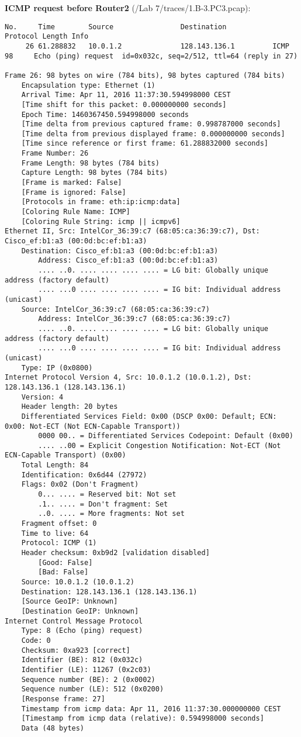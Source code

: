 \textbf{ICMP request before Router2} (/Lab 7/traces/1.B-3.PC3.pcap):
\begin{lstlisting}
No.     Time        Source                Destination           Protocol Length Info
     26 61.288832   10.0.1.2              128.143.136.1         ICMP     98     Echo (ping) request  id=0x032c, seq=2/512, ttl=64 (reply in 27)

Frame 26: 98 bytes on wire (784 bits), 98 bytes captured (784 bits)
    Encapsulation type: Ethernet (1)
    Arrival Time: Apr 11, 2016 11:37:30.594998000 CEST
    [Time shift for this packet: 0.000000000 seconds]
    Epoch Time: 1460367450.594998000 seconds
    [Time delta from previous captured frame: 0.998787000 seconds]
    [Time delta from previous displayed frame: 0.000000000 seconds]
    [Time since reference or first frame: 61.288832000 seconds]
    Frame Number: 26
    Frame Length: 98 bytes (784 bits)
    Capture Length: 98 bytes (784 bits)
    [Frame is marked: False]
    [Frame is ignored: False]
    [Protocols in frame: eth:ip:icmp:data]
    [Coloring Rule Name: ICMP]
    [Coloring Rule String: icmp || icmpv6]
Ethernet II, Src: IntelCor_36:39:c7 (68:05:ca:36:39:c7), Dst: Cisco_ef:b1:a3 (00:0d:bc:ef:b1:a3)
    Destination: Cisco_ef:b1:a3 (00:0d:bc:ef:b1:a3)
        Address: Cisco_ef:b1:a3 (00:0d:bc:ef:b1:a3)
        .... ..0. .... .... .... .... = LG bit: Globally unique address (factory default)
        .... ...0 .... .... .... .... = IG bit: Individual address (unicast)
    Source: IntelCor_36:39:c7 (68:05:ca:36:39:c7)
        Address: IntelCor_36:39:c7 (68:05:ca:36:39:c7)
        .... ..0. .... .... .... .... = LG bit: Globally unique address (factory default)
        .... ...0 .... .... .... .... = IG bit: Individual address (unicast)
    Type: IP (0x0800)
Internet Protocol Version 4, Src: 10.0.1.2 (10.0.1.2), Dst: 128.143.136.1 (128.143.136.1)
    Version: 4
    Header length: 20 bytes
    Differentiated Services Field: 0x00 (DSCP 0x00: Default; ECN: 0x00: Not-ECT (Not ECN-Capable Transport))
        0000 00.. = Differentiated Services Codepoint: Default (0x00)
        .... ..00 = Explicit Congestion Notification: Not-ECT (Not ECN-Capable Transport) (0x00)
    Total Length: 84
    Identification: 0x6d44 (27972)
    Flags: 0x02 (Don't Fragment)
        0... .... = Reserved bit: Not set
        .1.. .... = Don't fragment: Set
        ..0. .... = More fragments: Not set
    Fragment offset: 0
    Time to live: 64
    Protocol: ICMP (1)
    Header checksum: 0xb9d2 [validation disabled]
        [Good: False]
        [Bad: False]
    Source: 10.0.1.2 (10.0.1.2)
    Destination: 128.143.136.1 (128.143.136.1)
    [Source GeoIP: Unknown]
    [Destination GeoIP: Unknown]
Internet Control Message Protocol
    Type: 8 (Echo (ping) request)
    Code: 0
    Checksum: 0xa923 [correct]
    Identifier (BE): 812 (0x032c)
    Identifier (LE): 11267 (0x2c03)
    Sequence number (BE): 2 (0x0002)
    Sequence number (LE): 512 (0x0200)
    [Response frame: 27]
    Timestamp from icmp data: Apr 11, 2016 11:37:30.000000000 CEST
    [Timestamp from icmp data (relative): 0.594998000 seconds]
    Data (48 bytes)


\end{lstlisting}
